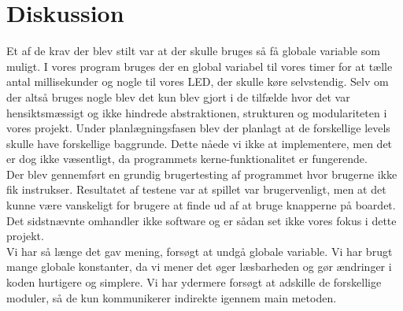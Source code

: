 \section{Diskussion}
Et af de krav der blev stilt var at der skulle bruges så få globale variable som muligt. I vores program bruges der en global variabel til vores timer for at tælle antal millisekunder og nogle til vores LED, der skulle køre selvstendig. Selv om der altså bruges nogle blev det kun blev gjort i de tilfælde hvor det var hensiktsmæssigt og ikke hindrede abstraktionen, strukturen og modulariteten i vores projekt.
Under planlægningsfasen blev der planlagt at de forskellige levels skulle have forskellige baggrunde. Dette nåede vi ikke at implementere, men det er dog ikke væsentligt, da programmets kerne-funktionalitet er fungerende.\\
Der blev gennemført en grundig brugertesting af programmet hvor brugerne ikke fik instrukser. Resultatet af testene var at spillet var brugervenligt, men at det kunne være vanskeligt for brugere at finde ud af at bruge knapperne på boardet. Det sidstnævnte omhandler ikke software og er sådan set ikke vores fokus i dette projekt. \\ 
Vi har så længe det gav mening, forsøgt at undgå globale variable. Vi har brugt mange globale konstanter, da vi mener det øger læsbarheden og gør ændringer i koden hurtigere og simplere. Vi har ydermere forsøgt at adskille de forskellige moduler, så de kun kommunikerer indirekte igennem main metoden.